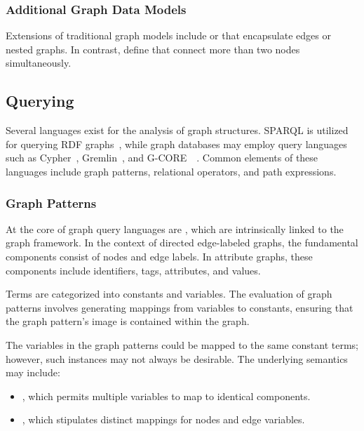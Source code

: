 \subsubsection{Additional Graph Data Models}
Extensions of traditional graph models include  or  that encapsulate edges or nested graphs. In contrast,  define  that connect more than two nodes simultaneously.

\subsection{Querying}\label{querying}
Several languages exist for the analysis of graph structures. SPARQL is utilized for querying RDF graphs~\cite{Harris2013SPARQL}, while graph databases may employ query languages such as Cypher~\cite{Francis2018Cypher}, Gremlin~\cite{Rodriguez2015Gremlin}, and G-CORE~\cite{Angles2018G-CORE}~\cite{Angles2017FoundationmodernQueryLnguagesforGraphDatabases}. Common elements of these languages include graph patterns, relational operators, and path expressions.

\subsubsection{Graph Patterns}
At the core of graph query languages are , which are intrinsically linked to the graph framework. In the context of directed edge-labeled graphs, the fundamental components consist of nodes and edge labels. In attribute graphs, these components include identifiers, tags, attributes, and values.

Terms are categorized into constants and variables. The evaluation of graph patterns involves generating mappings from variables to constants, ensuring that the graph pattern's image is contained within the graph.

The variables in the graph patterns could be mapped to the same constant terms; however, such instances may not always be desirable. The underlying semantics may include:
\begin{itemize}
    \item {}, which permits multiple variables to map to identical components.
    \item {}, which stipulates distinct mappings for nodes and edge variables.
\end{itemize}

